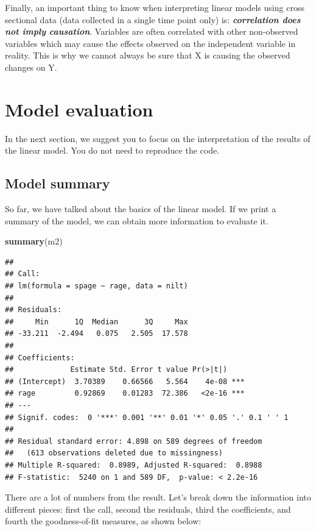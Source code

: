\documentclass[
]{book}
\newenvironment{Shaded}{\begin{snugshade}}{\end{snugshade}}
\newcommand{\FunctionTok}[1]{\textcolor[rgb]{0.13,0.29,0.53}{\textbf{#1}}}
\newcommand{\NormalTok}[1]{#1}
\begin{document}
Finally, an important thing to know when interpreting linear models using cross sectional data (data collected in a single time point only) is: \textbf{\emph{correlation does not imply causation}}. Variables are often correlated with other non-observed variables which may cause the effects observed on the independent variable in reality. This is why we cannot always be sure that X is causing the observed changes on Y.

\hypertarget{model-evaluation}{%
\section{Model evaluation}\label{model-evaluation}}

In the next section, we suggest you to focus on the interpretation of the results of the linear model. You do not need to reproduce the code.

\hypertarget{model-summary}{%
\subsection{Model summary}\label{model-summary}}

So far, we have talked about the basics of the linear model. If we print a summary of the model, we can obtain more information to evaluate it.

\begin{Shaded}
\begin{Highlighting}[]
\FunctionTok{summary}\NormalTok{(m2)}
\end{Highlighting}
\end{Shaded}

\begin{verbatim}
## 
## Call:
## lm(formula = spage ~ rage, data = nilt)
## 
## Residuals:
##     Min      1Q  Median      3Q     Max 
## -33.211  -2.494   0.075   2.505  17.578 
## 
## Coefficients:
##             Estimate Std. Error t value Pr(>|t|)    
## (Intercept)  3.70389    0.66566   5.564    4e-08 ***
## rage         0.92869    0.01283  72.386   <2e-16 ***
## ---
## Signif. codes:  0 '***' 0.001 '**' 0.01 '*' 0.05 '.' 0.1 ' ' 1
## 
## Residual standard error: 4.898 on 589 degrees of freedom
##   (613 observations deleted due to missingness)
## Multiple R-squared:  0.8989, Adjusted R-squared:  0.8988 
## F-statistic:  5240 on 1 and 589 DF,  p-value: < 2.2e-16
\end{verbatim}

There are a lot of numbers from the result. Let's break down the information into different pieces: first the call, second the residuals, third the coefficients, and fourth the goodness-of-fit measures, as shown below:
\end{document}
